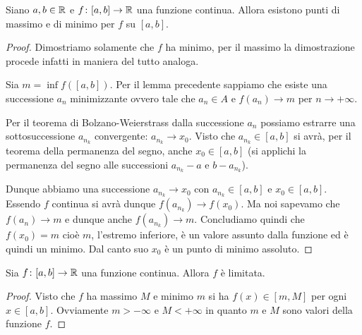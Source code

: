 \begin{theorem}[Weierstrass]%
\label{th:weierstrass}%
\mymark{***}%
%
%
%
Siano $a,b\in {\mathbb R}$ e $f\colon [a,b]\to {\mathbb R}$ una funzione continua.
%
Allora esistono punti di massimo e di minimo per $f$ su $[a,b]$.
\end{theorem}
%
\begin{proof}
\mymark{***}%
Dimostriamo solamente che $f$ ha minimo, per il massimo la dimostrazione procede
infatti in maniera del tutto analoga.

Sia $m= \inf f([a,b])$.
Per il lemma precedente sappiamo che esiste una successione $a_n$ minimizzante ovvero tale che
$a_n \in A$ e $f(a_n)\to m$ per $n\to +\infty$.

Per il teorema di Bolzano-Weierstrass dalla successione $a_n$ possiamo estrarre una sottosuccessione 
$a_{n_k}$ convergente: $a_{n_k} \to x_0$.
Visto che $a_{n_k} \in [a,b]$ si avrà, per il teorema della permanenza del segno, anche 
$x_0 \in [a,b]$ (si applichi la permanenza del segno alle successioni $a_{n_k}-a$ e $b-a_{n_k}$).

Dunque abbiamo una successione $a_{n_k}\to x_0$ con $a_{n_k}\in [a,b]$ e
$x_0 \in [a,b]$. Essendo $f$ continua si avrà dunque $f(a_{n_k}) \to f(x_0)$.
Ma noi sapevamo che $f(a_n)\to m$ e dunque anche $f(a_{n_k}) \to m$.
Concludiamo quindi che $f(x_0) = m$ cioè $m$, l'estremo inferiore,
è un valore assunto dalla funzione ed è quindi un minimo.
Dal canto suo $x_0$ è un punto di minimo assoluto.
\end{proof}

\begin{corollary}
Sia $f\colon [a,b]\to {\mathbb R}$ una funzione continua. Allora $f$ è limitata.
\end{corollary}
\begin{proof}
Visto che $f$ ha massimo $M$ e minimo $m$ si ha $f(x)\in [m,M]$ per ogni $x\in[a,b]$.
Ovviamente $m>-\infty$ e $M<+\infty$ in quanto $m$ e $M$ sono valori della funzione $f$.
\end{proof}

